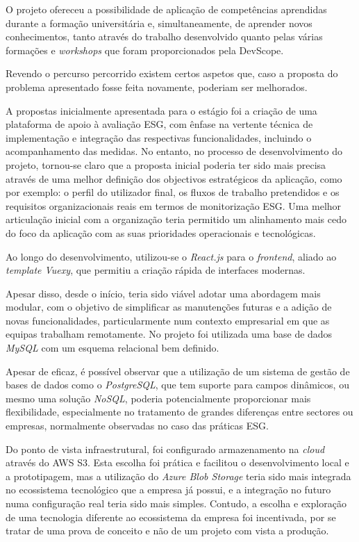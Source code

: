 O projeto ofereceu a possibilidade de aplicação de competências aprendidas durante a formação universitária e, simultaneamente, de aprender novos conhecimentos, tanto através do trabalho desenvolvido quanto pelas várias formações e \textit{workshops} que foram proporcionados pela DevScope.

Revendo o percurso percorrido existem certos aspetos que, caso a proposta do problema apresentado fosse feita novamente, poderiam ser melhorados.

A propostas inicialmente apresentada para o estágio foi a criação de uma plataforma de apoio à avaliação ESG, com ênfase na vertente técnica de implementação e integração das respectivas funcionalidades, incluindo o acompanhamento das medidas. No entanto, no processo de desenvolvimento do projeto, tornou-se claro que a proposta inicial poderia ter sido mais precisa através de uma melhor definição dos objectivos estratégicos da aplicação, como por exemplo: o perfil do utilizador final, os fluxos de trabalho pretendidos e os requisitos organizacionais reais em termos de monitorização ESG. Uma melhor articulação inicial com a organização teria permitido um alinhamento mais cedo do foco da aplicação com as suas prioridades operacionais e tecnológicas.

Ao longo do desenvolvimento, utilizou-se o \textit{React.js} para o \textit{frontend}, aliado ao \textit{template Vuexy}, que permitiu a criação rápida de interfaces modernas.

Apesar disso, desde o início, teria sido viável adotar uma abordagem mais modular, com o objetivo de simplificar as manutenções futuras e a adição de novas funcionalidades, particularmente num contexto empresarial em que as equipas trabalham remotamente. No projeto foi utilizada uma base de dados \textit{MySQL} com um esquema relacional bem definido.

Apesar de eficaz, é possível observar que a utilização de um sistema de gestão de bases de dados como o \textit{PostgreSQL}, que tem suporte para campos dinâmicos, ou mesmo uma solução \textit{NoSQL}, poderia potencialmente proporcionar mais flexibilidade, especialmente no tratamento de grandes diferenças entre sectores ou empresas, normalmente observadas no caso das práticas ESG.

Do ponto de vista infraestrutural, foi configurado armazenamento na \textit{cloud} através do AWS S3. Esta escolha foi prática e facilitou o desenvolvimento local e a prototipagem, mas a utilização do \textit{Azure Blob Storage} teria sido mais integrada no ecossistema tecnológico que a empresa já possui, e a integração no futuro numa configuração real teria sido mais simples. Contudo, a escolha e exploração de uma tecnologia diferente ao ecossistema da empresa foi incentivada, por se tratar de uma prova de conceito e não de um projeto com vista a produção.

